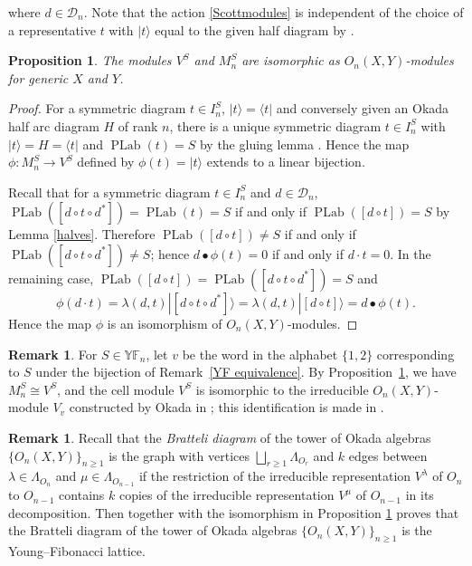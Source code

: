 \documentclass[12pt,reqno]{amsart}
\numberwithin{equation}{section}
\newtheorem{proposition}[theorem]{Proposition}
\theoremstyle{definition}
\theoremstyle{definition}
\newtheorem{remark}[theorem]{Remark}
\newcommand{\YF}{\mathbb{YF}}
\newcommand{\PLab}{\operatorname{PLab}}
\begin{document}
where $d \in \mathcal{D}_n$. Note that the action \eqref{Scottmodules} is independent of the choice of a representative $t$ with $ |t \rangle$ equal to the given half diagram by \cite[Remark 6.4]{HivertScott}.
\begin{proposition}\label{iso}
    The modules $V^S$ and $M_n^S$ are isomorphic as $O_n(X,Y)$-modules for generic $X$ and $Y$.
\end{proposition}
\begin{proof}
    For a symmetric diagram $t \in I_n^S$, $| t \rangle = \langle t |$ and conversely given an Okada half arc diagram $H$ of rank $n$, there is a unique symmetric diagram $t \in I_n^S$ with $ | t \rangle =H=  \langle t |$ and $\PLab(t)=S$ by the gluing lemma \cite[Lemma 4.4]{HivertScott}.
Hence the map $\phi: M_n^S \to V^S$ defined by $\phi(t)= | t \rangle$ extends to a linear bijection. 


Recall that for a symmetric diagram $t \in I_n^S$ and $d \in \mathcal{D}_n$, $\PLab([ d \circ t \circ d^*])= \PLab(t)=S$ if and only if $\PLab([d \circ t])=S$ by Lemma \ref{halves}.
Therefore $\PLab([d \circ t]) \neq S$ if and only if $\PLab([d \circ t \circ d^*]) \neq S$; hence $d \bullet \phi(t)=0$  if and only if $d \cdot t =0$.
In the remaining case, $\PLab([d \circ t]) = \PLab([ d \circ t \circ d^*])=S$ and
\[
\phi(d \cdot t)= \lambda(d,t) | [ d \circ t \circ d^*] \rangle = \lambda(d,t) |[d \circ t]\rangle = d \bullet \phi(t).
\]
Hence the map $\phi$ is an isomorphism of $O_n(X,Y)$-modules. 
\end{proof}
\begin{remark}
For $S\in\YF_n$, let $v$ be the word in the alphabet $\{1,2\}$ corresponding to
$S$ under the bijection of Remark~\ref{YF equivalence}. By
Proposition~\ref{iso}, we have $M_n^S\cong V^S$, and the cell module $V^S$ is
isomorphic to the irreducible $O_n(X,Y)$-module $V_v$ constructed by Okada
in \cite{Okada}; this identification is made in \cite[\S7.1]{HivertScott}.
\end{remark}
\begin{remark}
Recall that the \emph{Bratteli diagram} of the tower of Okada algebras
$\{O_n(X,Y)\}_{n\geq 1}$ is the graph with vertices
$\bigsqcup_{r\geq 1}\Lambda_{O_r}$ and $k$ edges between
$\lambda\in\Lambda_{O_n}$ and $\mu\in\Lambda_{O_{n-1}}$ if the restriction
of the irreducible representation $V^\lambda$ of $O_n$ to $O_{n-1}$
contains $k$ copies of the irreducible representation $V^\mu$ of
$O_{n-1}$ in its decomposition. Then \cite[Proposition 6.6]{HivertScott} together with the isomorphism in Proposition \ref{iso} proves that the Bratteli diagram of the tower of Okada algebras $\{O_n(X,Y)\}_{n\geq 1}$ is the Young--Fibonacci lattice. 
\end{remark}
\end{document}
